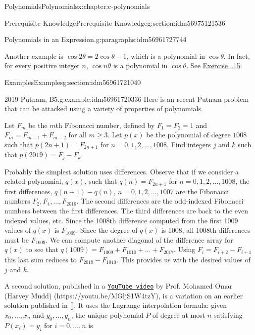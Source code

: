\documentclass[twoside,10pt,]{book}
\newcommand{\xreffont}{\relax}
\numberwithin{equation}{section}
\begin{document}
\begin{chapterptx}{Polynomials}{}{Polynomials}{}{}{x:chapter:c-polynomials}
\begin{sectionptx}{Prerequisite Knowledge}{}{Prerequisite Knowledge}{}{}{g:section:idm56975121536}
\begin{paragraphs}{Polynomials in an Expression.}{g:paragraphs:idm56961727744}
\par
Another example is \(\cos{2 \theta}= 2 \cos{\theta} - 1\), which is a polynomial in \(\cos{\theta}\).  In fact, for every positive integer \(n\),  \(\cos{n \theta}\) is a polynomial in \(\cos{\theta}\). See \hyperlink{x:exercise:exercise-chebyshev}{Exercise~{\xreffont 9.3.15}}.%
\end{paragraphs}%
\end{sectionptx}
%
%
\typeout{************************************************}
\typeout{************************************************}
%
\begin{sectionptx}{Examples}{}{Examples}{}{}{g:section:idm56961721040}
\begin{example}{2019 Putnam, B5.}{g:example:idm56961720336}%
Here is an recent Putnam problem that can be attacked using a variety of properties of polynomials.%
\par
Let \(F_m\) be the \(m\)th Fibonacci number, defined by \(F_1 = F_2 = 1\) and \(F_m = F_{m-1} + F_{m-2}\) for all \(m \geq 3\). Let \(p(x)\) be the polynomial of degree \(1008\) such that \(p(2n+1) = F_{2n+1}\) for \(n=0,1,2,\dots,1008\). Find integers \(j\) and \(k\) such that \(p(2019) = F_j - F_k\).%
\par
Probably the simplest solution uses differences.  Observe that if we consider a related polynomial, \(q(x)\), such that  \(q(n) = F_{2n+1}\) for \(n=0,1,2,\dots,1008\), the first differences, \(q(n+1)-q(n)\), \(n=0,1,2,\dots,1007\) are the Fibonacci numbers \(F_2, F_4, \dots, F_{2016}\). The second differences are the odd-indexed Fibonacci numbers between the first differences.  The third differences are back to the even indexed values, etc.   Since the 1008th difference computed from the first 1009 values of \(q(x)\) is \(F_{1009}\). Since the degree of \(q(x)\) is 1008, all 1008th differences must be  \(F_{1009}\).  We can compute another diagonal of the difference array for \(q(x)\) to see that \(q(1009) = F_{1009}+F_{1010}+\dots +F_{2017}\).  Using \(F_{i}=F_{i+2}-F_{i+1}\) this last sum reduces to \(F_{2019}-F_{1010}\).  This provides us with the desired values of \(j\) and \(k\).%
\par
A second solution, published in a \href{https://youtu.be/MGljS1W4tzY}{\nolinkurl{YouTube video}}  by Prof. Mohamed Omar (Harvey Mudd)  (https:\slash{}\slash{}youtu.be\slash{}MGljS1W4tzY), is a variation on an earlier solution published in \hyperlink{x:biblio:biblio-putnam-archive}{[{\xreffont 10}]}. It uses the Lagrange interpolation formula: given \(x_0,\dots,x_n\) and \(y_0,\dots,y_n\), the unique polynomial \(P\) of degree at most \(n\) satisfying \(P(x_i) = y_i\) for \(i=0,\dots,n\) is%

\end{example}
\end{sectionptx}
\end{chapterptx}
\end{document}
